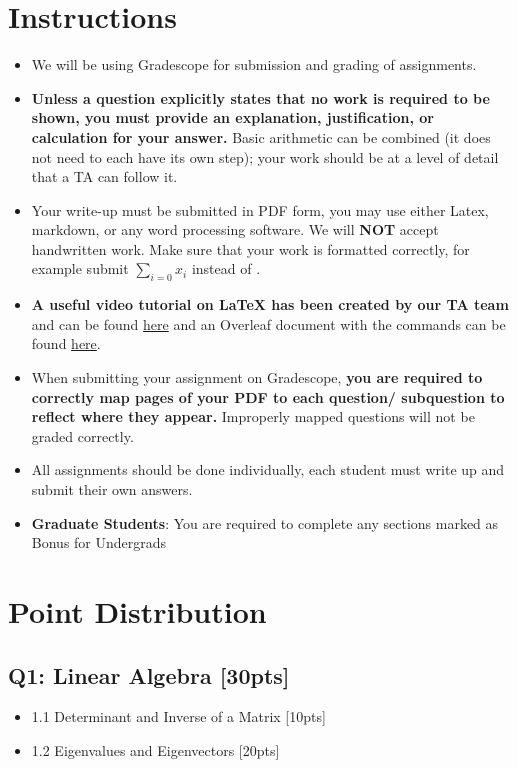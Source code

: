 \documentclass{article}
\begin{document}
\section*{Instructions}
\begin{itemize}
    \item We will be using Gradescope for submission and grading of assignments. 
    \item \textbf{Unless a question explicitly states that no work is required to be shown, you must provide an explanation, justification, or calculation for your answer.} Basic arithmetic can be combined (it does not need to each have its own step); your work should be at a level of detail that a TA can follow it.
    \item Your write-up must be submitted in PDF form, you may use either Latex,  markdown, or any word processing software. \color{red}We will \textbf{NOT} accept handwritten work. \color{black}Make sure that your work is formatted correctly, for example submit $\sum_{i=0} x_i$ instead of . 
    \item \textbf{A useful video tutorial on LaTeX has been created by our TA team} and can be found \href{https://www.dropbox.com/s/wywx114wtfoweru/Latex\%20Tutorial.mp4?dl=0}{here} and an Overleaf document with the commands can be found \href{https://www.overleaf.com/read/yjxbshkffvkm}{here}.

    \item When submitting your assignment on Gradescope, \textbf{you are required to correctly map pages of your PDF to each question/ subquestion to reflect where they appear.}  Improperly mapped questions will not be graded correctly.
    \item All assignments should be done individually, each student must write up and submit their own answers.
    \item \color{red}\textbf{Graduate Students}\color{black}: You are required to complete any sections marked as Bonus for Undergrads
\end{itemize}
\newpage

\section*{Point Distribution}
\subsection*{Q1: Linear Algebra [30pts]}
\begin{itemize}
    \item 1.1 Determinant and Inverse of a Matrix [10pts]
    \item 1.2 Eigenvalues and Eigenvectors [20pts]
\end{itemize}
\end{document}
